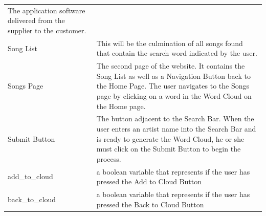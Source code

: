 \documentclass[]{article}
\begin{document}
\begin{longtable}[c]{@{}ll@{}}
\begin{minipage}[t]{0.47\columnwidth}
The application software delivered from the supplier to the customer.
\end{minipage}
\\\addlinespace
\begin{minipage}[t]{0.47\columnwidth}\raggedright
Song List
\end{minipage} & \begin{minipage}[t]{0.47\columnwidth}\raggedright
This will be the culmination of all songs found that contain the search
word indicated by the user.
\end{minipage}
\\\addlinespace
\begin{minipage}[t]{0.47\columnwidth}\raggedright
Songs Page
\end{minipage} & \begin{minipage}[t]{0.47\columnwidth}\raggedright
The second page of the website. It contains the Song List as well as a
Navigation Button back to the Home Page. The user navigates to the Songs
page by clicking on a word in the Word Cloud on the Home page.
\end{minipage}
\\\addlinespace
\begin{minipage}[t]{0.47\columnwidth}\raggedright
Submit Button
\end{minipage} & \begin{minipage}[t]{0.47\columnwidth}\raggedright
The button adjacent to the Search Bar. When the user enters an artist
name into the Search Bar and is ready to generate the Word Cloud, he or she must click on the Submit Button to begin the process.
\end{minipage}
\\\addlinespace
\begin{minipage}[t]{0.47\columnwidth}\raggedright
add\_to\_cloud
\end{minipage} & \begin{minipage}[t]{0.47\columnwidth}\raggedright
a boolean variable that represents if the user has pressed the Add to Cloud Button
\end{minipage}
\\\addlinespace
\begin{minipage}[t]{0.47\columnwidth}\raggedright
back\_to\_cloud
\end{minipage} & \begin{minipage}[t]{0.47\columnwidth}\raggedright
a boolean variable that represents if the user has pressed the Back to Cloud Button
\end{minipage}

\end{longtable}
\end{document}
